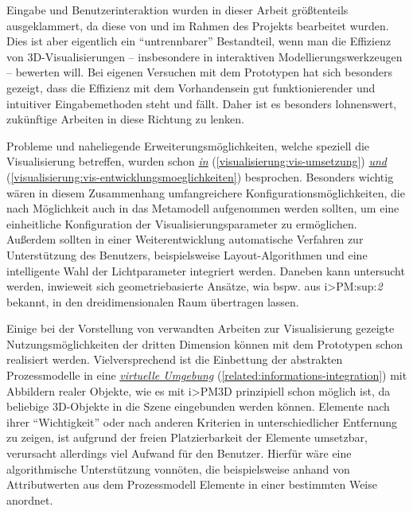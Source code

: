 \documentclass[a4paper,10pt]{sphinxmanual}
\begin{document}
Eingabe und Benutzerinteraktion wurden in dieser Arbeit größtenteils ausgeklammert, da diese von \cite{uli} und \cite{buchi} im Rahmen des Projekts bearbeitet wurden.
Dies ist aber eigentlich ein "`untrennbarer"' Bestandteil, wenn man die Effizienz von 3D-Visualisierungen – insbesondere in interaktiven Modellierungswerkzeugen – bewerten will.
Bei eigenen Versuchen mit dem Prototypen hat sich besonders gezeigt, dass die Effizienz mit dem Vorhandensein gut funktionierender und intuitiver Eingabemethoden steht und fällt.
Daher ist es besonders lohnenswert, zukünftige Arbeiten in diese Richtung zu lenken.

Probleme und naheliegende Erweiterungsmöglichkeiten, welche speziell die Visualisierung betreffen, wurden schon {\hyperref[visualisierung:vis-umsetzung]{\emph{in}}} (\autoref*{visualisierung:vis-umsetzung}) {\hyperref[visualisierung:vis-entwicklungsmoeglichkeiten]{\emph{und}}} (\autoref*{visualisierung:vis-entwicklungsmoeglichkeiten}) besprochen.
Besonders wichtig wären in diesem Zusammenhang umfangreichere Konfigurationsmöglichkeiten, die nach Möglichkeit auch in das Metamodell aufgenommen werden sollten, um eine einheitliche Konfiguration der Visualisierungsparameter zu ermöglichen.
Außerdem sollten in einer Weiterentwicklung automatische Verfahren zur Unterstützung des Benutzers, beispielsweise Layout-Algorithmen und eine intelligente Wahl der Lichtparameter integriert werden.
Daneben kann untersucht werden, inwieweit sich geometriebasierte Ansätze, wia bspw. aus i\textgreater{}PM:sup:\emph{2} bekannt, in den dreidimensionalen Raum übertragen lassen.

Einige bei der Vorstellung von verwandten Arbeiten zur Visualisierung gezeigte Nutzungsmöglichkeiten der dritten Dimension können mit dem Prototypen schon realisiert werden.
Vielversprechend ist die Einbettung der abstrakten Prozessmodelle in eine {\hyperref[related:informations-integration]{\emph{virtuelle Umgebung}}} (\autoref*{related:informations-integration}) mit Abbildern realer Objekte, wie es mit i\textgreater{}PM3D prinzipiell schon möglich ist, da beliebige 3D-Objekte in die Szene eingebunden werden können.
Elemente nach ihrer "`Wichtigkeit"' oder nach anderen Kriterien in unterschiedlicher Entfernung zu zeigen, ist aufgrund der freien Platzierbarkeit der Elemente umsetzbar, verursacht allerdings viel Aufwand für den Benutzer.
Hierfür wäre eine algorithmische Unterstützung vonnöten, die beispielsweise anhand von Attributwerten aus dem Prozessmodell Elemente in einer bestimmten Weise anordnet.
\end{document}
